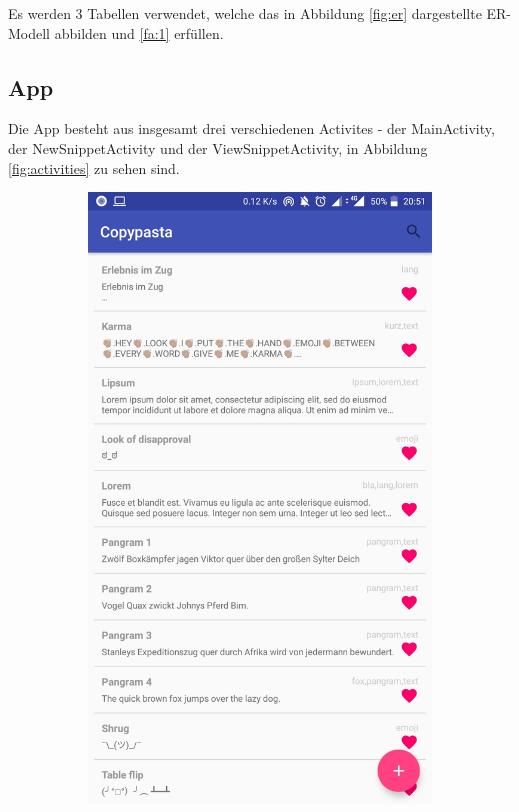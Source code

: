 \documentclass[11pt]{article}
\begin{document}
	\noindent Es werden 3 Tabellen verwendet, welche das in Abbildung \ref{fig:er} dargestellte ER-Modell abbilden und \ref{fa:1} erfüllen.\medskip
	
	
	\subsection{App}
	Die App besteht aus insgesamt drei verschiedenen Activites - der MainActivity, der NewSnippetActivity und der ViewSnippetActivity, in Abbildung \ref{fig:activities} zu sehen sind. 
	
	\begin{figure}
		\centering
		\begin{subfigure}[b]{0.3\textwidth}
			\includegraphics[width=\textwidth]{Konzepte/screenshots/main_list.jpg}

\end{subfigure}
\end{figure}
\end{document}
